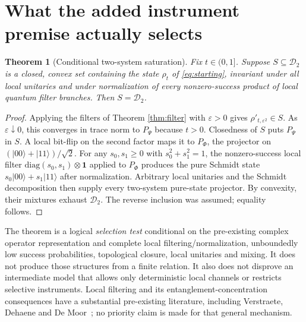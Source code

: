 \documentclass[10pt,letterpaper]{article}
\newtheorem{theorem}{Theorem}
\newcommand{\D}{\mathcal D}
\newcommand{\I}{\mathbf 1}
\begin{document}
\section{What the added instrument premise actually selects}
\begin{theorem}[Conditional two-system saturation]\label{thm:saturation}
Fix $t\in(0,1]$. Suppose $S\subseteq\D_2$ is a \emph{closed, convex} set containing the state $\rho_t$ of \eqref{eq:starting}, invariant under all local unitaries and under \emph{normalization of every nonzero-success product of local quantum filter branches}. Then $S=\D_2$.
\end{theorem}
\begin{proof}
Applying the filters of Theorem \ref{thm:filter} with $\varepsilon>0$ gives $\rho'_{t,\varepsilon^2}\in S$. As $\varepsilon\downarrow0$, this converges in trace norm to $P_\Psi$ because $t>0$. Closedness of $S$ puts $P_\Psi$ in $S$. A local bit-flip on the second factor maps it to $P_\Phi$, the projector on $(|00\rangle+|11\rangle)/\sqrt2$. For any $s_0,s_1\ge0$ with $s_0^2+s_1^2=1$, the nonzero-success local filter $\mathrm{diag}(s_0,s_1)\otimes\I$ applied to $P_\Phi$ produces the pure Schmidt state $s_0|00\rangle+s_1|11\rangle$ after normalization. Arbitrary local unitaries and the Schmidt decomposition then supply every two-system pure-state projector. By convexity, their mixtures exhaust $\D_2$. The reverse inclusion was assumed; equality follows.\end{proof}

The theorem is a logical \emph{selection test} conditional on the pre-existing complex operator representation and complete local filtering/normalization, unboundedly low success probabilities, topological closure, local unitaries and mixing. It does not produce those structures from a finite relation. It also does not disprove an intermediate model that allows only deterministic local channels or restricts selective instruments. Local filtering and its entanglement-concentration consequences have a substantial pre-existing literature, including Verstraete, Dehaene and De Moor~\cite{Verstraete2001}; no priority claim is made for that general mechanism.
\end{document}
